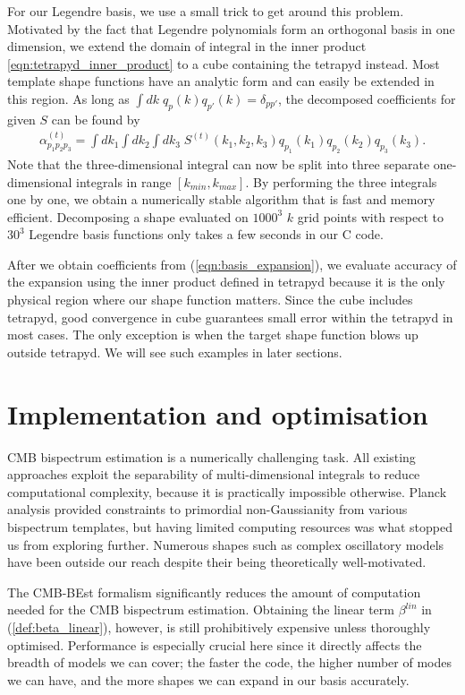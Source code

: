 For our Legendre basis, we use a small trick to get around this problem. Motivated by the fact that Legendre polynomials form an orthogonal basis in one dimension, we extend the domain of integral in the inner product \eqref{eqn:tetrapyd_inner_product} to a cube containing the tetrapyd instead. Most template shape functions have an analytic form and can easily be extended in this region. As long as $\int dk \; q_p(k) q_{p'}(k) = \delta_{pp'}$, the decomposed coefficients for given $S$ can be found by
\begin{align}
	\alpha^{(t)}_{p_1 p_2 p_3} = \int dk_1 \int dk_2 \int dk_3 \; S^{(t)}(k_1, k_2, k_3) q_{p_1}(k_1) q_{p_2}(k_2) q_{p_3}(k_3). \label{eqn:basis_expansion}
\end{align}
Note that the three-dimensional integral can now be split into three separate one-dimensional integrals in range $[k_{min}, k_{max}]$. By performing the three integrals one by one, we obtain a numerically stable algorithm that is fast and memory efficient. Decomposing a shape evaluated on $1000^3$ $k$ grid points with respect to $30^3$ Legendre basis functions only takes a few seconds in our \textsc{C} code.

After we obtain coefficients from (\ref{eqn:basis_expansion}), we evaluate accuracy of the expansion using the inner product defined in tetrapyd because it is the only physical region where our shape function matters. Since the cube includes tetrapyd, good convergence in cube guarantees small error within the tetrapyd in most cases. The only exception is when the target shape function blows up outside tetrapyd. We will see such examples in later sections.


\section{Implementation and optimisation} \label{section:implementation}

CMB bispectrum estimation is a numerically challenging task. All existing approaches exploit the separability of multi-dimensional integrals to reduce computational complexity, because it is practically impossible otherwise. Planck analysis provided constraints to primordial non-Gaussianity from various bispectrum templates, but having limited computing resources was what stopped us from exploring further. Numerous shapes such as complex oscillatory models have been outside our reach despite their being theoretically well-motivated.

The CMB-BEst formalism significantly reduces the amount of computation needed for the CMB bispectrum estimation. Obtaining the linear term $\beta^{lin}$ in (\ref{def:beta_linear}), however, is still prohibitively expensive unless thoroughly optimised. Performance is especially crucial here since it directly affects the breadth of models we can cover; the faster the code, the higher number of modes we can have, and the more shapes we can expand in our basis accurately.

